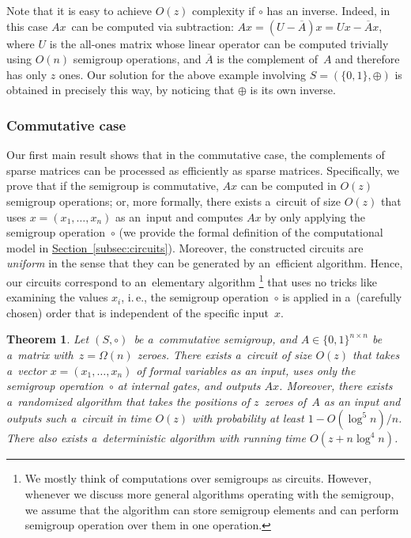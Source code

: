 \documentclass[11pt]{article}
\numberwithin{equation}{section}
\newtheorem{theorem}{Theorem}[section]
\theoremstyle{definition}
\theoremstyle{plain}
\newcommand{\ie}{i.\,e.}
\newcommand{\expref}[2]{\hyperref[#2]{#1~\ref{#2}}}
\theoremstyle{plain}\newtheorem{observation}[theorem]{Observation}
\begin{document}
\noindent
Note that it is easy to achieve $O(z)$ complexity if $\circ$ has an inverse.
Indeed, in this case $Ax$~can be computed via subtraction:
$Ax = (U-\overline{A})x = Ux - \overline{A}x$, where $U$ is the all-ones matrix
whose linear operator can be computed trivially using $O(n)$ semigroup
operations, and $\overline{A}$ is the complement of~$A$ and therefore has only
$z$ ones. Our solution for the above example involving $S=(\{0,1\}, \oplus)$
is obtained in precisely this way, by noticing that $\oplus$ is its own inverse.

\subsubsection{Commutative case}
Our first main result shows that in the commutative case,
the %
complements
of sparse matrices can be processed as
efficiently as sparse matrices. Specifically, we prove
that if the semigroup is commutative, $Ax$ can be computed in $O(z)$ semigroup
operations; or, more formally, there exists
a~circuit of size $O(z)$ that uses $x=(x_1, \dotsc, x_n)$ as
an~input and computes $Ax$ by only applying the semigroup
operation~$\circ$ (we provide the formal definition of the
computational model in \expref{Section}{subsec:circuits}). Moreover,
the constructed circuits are \emph{uniform} in the sense that they
can be generated by an~efficient algorithm. Hence, our circuits
correspond to an~elementary algorithm%
\footnote{We mostly think of computations over semigroups as circuits. However, whenever we discuss more general algorithms operating with the semigroup, we assume that the algorithm can store semigroup elements and can perform semigroup operation over them in one operation.}
%
 that uses no tricks like examining the
values $x_i$, \ie, the semigroup operation~$\circ$ is applied in a~(carefully
chosen) order that is independent of the specific input~$x$.

\begin{theorem}
\label{thm:upperboundold}
Let $(S, \circ)$~be a~commutative semigroup,
and $A \in \{0,1\}^{n \times n}$ be a~matrix
with~$z=\Omega(n)$ zeroes.
There exists a~circuit of size $O(z)$ that takes
a~vector $x = (x_1,\ldots, x_n)$ of formal variables as an input,
uses only the semigroup operation~$\circ$ at internal gates,
and outputs $Ax$. Moreover, there exists a~randomized
algorithm that takes the positions of $z$~zeroes of~$A$
as an input and outputs such a~circuit in time $O(z)$
with probability at least $1-O(\log^5n)/n$. There also
exists a~deterministic algorithm with running time $O(z+n\log^4n)$.
\end{theorem}
\end{document}
